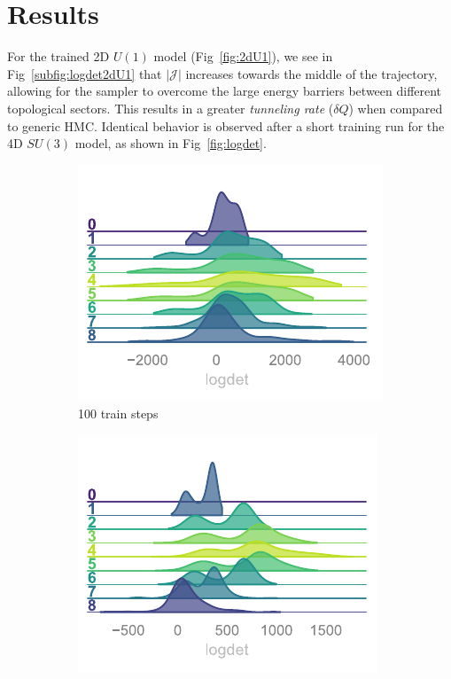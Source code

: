 \documentclass[a4paper,11pt]{article}
\begin{document}
\section{\label{sec:results}Results}
%
For the trained 2D $U(1)$ model (Fig~\ref{fig:2dU1}), we see in Fig~\ref{subfig:logdet2dU1} that 
%
$\left|\mathcal{J}\right|$
%
increases towards the middle of the trajectory, allowing for the sampler to overcome the large energy barriers between different topological sectors.
%
This results in a greater \emph{tunneling rate} ($\delta Q$) when compared to generic HMC.
%
Identical behavior is observed after a short training run for the 4D $SU(3)$ model, as shown in Fig~\ref{fig:logdet}.
%
\begin{figure}[htpb!]
    \centering
    \begin{subfigure}{0.31\textwidth}
        \includegraphics[width=\textwidth]{assets/logdet-1.pdf}
        \caption{\label{subfig:logdet1} 100 train steps}
    \end{subfigure}
    \hfill
    \begin{subfigure}{0.31\textwidth}
        \includegraphics[width=\textwidth]{assets/logdet-2.pdf}

\end{subfigure}
\end{figure}
\end{document}
